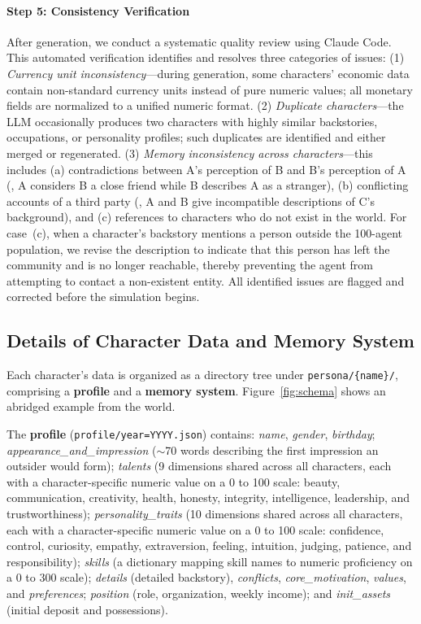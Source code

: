 \paragraph{Step 5: Consistency Verification}
After generation, we conduct a systematic quality review using Claude Code.
This automated verification identifies and resolves three categories of issues:
(1) \textit{Currency unit inconsistency}---during generation, some characters' economic data contain non-standard currency units
instead of pure numeric values; all monetary fields are normalized to a unified numeric format.
(2) \textit{Duplicate characters}---the LLM occasionally produces two characters with highly similar backstories, occupations, or personality profiles; such duplicates are identified and either merged or regenerated.
(3) \textit{Memory inconsistency across characters}---this includes
(a) contradictions between A's perception of B and B's perception of A (\eg, A considers B a close friend while B describes A as a stranger),
(b) conflicting accounts of a third party (\eg, A and B give incompatible descriptions of C's background), and
(c) references to characters who do not exist in the world.
For case~(c), when a character's backstory mentions a person outside the 100-agent population, we revise the description to indicate that this person has left the community and is no longer reachable, thereby preventing the agent from attempting to contact a non-existent entity.
All identified issues are flagged and corrected before the simulation begins.

\subsection{Details of Character Data and Memory System}
\label{app:schema}

Each character's data is organized as a directory tree under \texttt{persona/\{name\}/}, comprising a \textbf{profile} and a \textbf{memory system}.
Figure~\ref{fig:schema} shows an abridged example from the \academy{} world.

The \textbf{profile} (\texttt{profile/year=YYYY.json}) contains:
\textit{name}, \textit{gender}, \textit{birthday};
\textit{appearance\_and\_impression} ($\sim$70 words describing the first impression an outsider would form);
\textit{talents} (9 dimensions shared across all characters, each with a character-specific numeric value on a 0 to 100 scale: beauty, communication, creativity, health, honesty, integrity, intelligence, leadership, and trustworthiness);
\textit{personality\_traits} (10 dimensions shared across all characters, each with a character-specific numeric value on a 0 to 100 scale: confidence, control, curiosity, empathy, extraversion, feeling, intuition, judging, patience, and responsibility);
\textit{skills} (a dictionary mapping skill names to numeric proficiency on a 0 to 300 scale);
\textit{details} (detailed backstory), \textit{conflicts}, \textit{core\_motivation}, \textit{values}, and \textit{preferences};
\textit{position} (role, organization, weekly income);
and \textit{init\_assets} (initial deposit and possessions).


